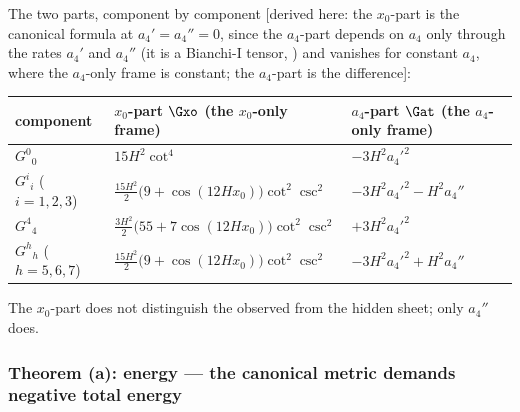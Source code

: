 The two parts, component by component [derived here: the $x_0$-part is the canonical formula at
$a_4'=a_4''=0$, since the $a_4$-part depends on $a_4$ only through the rates $a_4'$ and $a_4''$ (it is a
Bianchi-I tensor, ) and vanishes for constant $a_4$, where the $a_4$-only frame is
constant; the $a_4$-part is the difference]:
\begin{center}
\renewcommand{\arraystretch}{1.35}
\begin{tabular}{@{}lll@{}}
\toprule
component & $x_0$-part $\Gxo$ (the $x_0$-only frame) & $a_4$-part $\Gat$ (the $a_4$-only frame)\\
\midrule
$G^0{}_0$ & $15H^2\cot^4$ & $-3H^2a_4'^2$\\
$G^i{}_i$ ($i=1,2,3$) & $\frac{15H^2}{2}\bigl(9+\cos(12Hx_0)\bigr)\cot^2\csc^2$ & $-3H^2a_4'^2-H^2a_4''$\\
$G^4{}_4$ & $\frac{3H^2}{2}\bigl(55+7\cos(12Hx_0)\bigr)\cot^2\csc^2$ & $+3H^2a_4'^2$\\
$G^h{}_h$ ($h=5,6,7$) & $\frac{15H^2}{2}\bigl(9+\cos(12Hx_0)\bigr)\cot^2\csc^2$ & $-3H^2a_4'^2+H^2a_4''$\\
\bottomrule
\end{tabular}
\end{center}
The $x_0$-part does not distinguish the observed from the hidden sheet; only $a_4''$ does.

\subsubsection{Theorem (a): energy --- the canonical metric demands negative total energy}
\label{sec:4.2.4}

